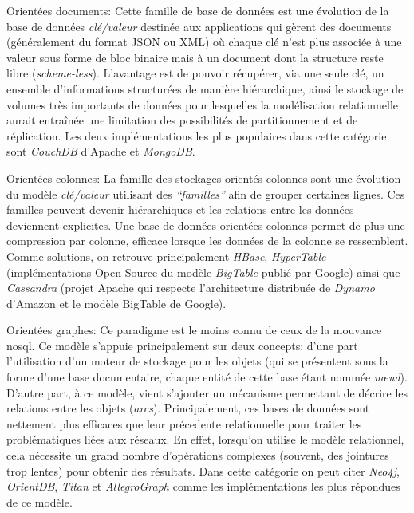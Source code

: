   \textsf{Orientées documents}: Cette famille de base de données est
  une évolution de la base de données \textit{clé/valeur} destinée aux
  applications qui gèrent des documents (généralement du format
  \textsc{JSON} ou \textsc{XML}) où chaque clé n'est plus associée à
  une valeur sous forme de bloc binaire mais à un document dont la
  structure reste libre (\textit{scheme-less}). L'avantage est de
  pouvoir récupérer, via une seule clé, un ensemble d’informations
  structurées de manière hiérarchique, ainsi le stockage de
  volumes très importants de données pour lesquelles la modélisation
  relationnelle aurait entraînée une limitation des possibilités de
  partitionnement et de réplication. Les deux implémentations les plus
  populaires dans cette catégorie sont \emph{CouchDB} d'Apache et
  \emph{MongoDB}.\bigskip

  \textsf{Orientées colonnes}: La famille des stockages orientés
  colonnes sont une évolution du modèle \textit{clé/valeur} utilisant
  des \textit{``familles''} afin de grouper certaines lignes. Ces
  familles peuvent devenir hiérarchiques et les relations entre les
  données deviennent explicites. Une base de données orientées
  colonnes permet de plus une compression par colonne, efficace
  lorsque les données de la colonne se ressemblent. Comme solutions,
  on retrouve principalement \emph{HBase}, \emph{HyperTable}
  (implémentations Open Source du modèle \emph{BigTable}
  \cite{chang2008bigtable} publié par Google) ainsi que
  \emph{Cassandra} (projet Apache qui respecte l'architecture
  distribuée de \emph{Dynamo} \cite{decandia2007dynamo} d'Amazon et le
  modèle BigTable de Google).\bigskip

  \textsf{Orientées graphes}: Ce paradigme est le moins connu de ceux
  de la mouvance \acrshort{nosql}. Ce modèle s'appuie principalement
  sur deux concepts: d'une part l'utilisation d'un moteur de stockage
  pour les objets (qui se présentent sous la forme d'une base
  documentaire, chaque entité de cette base étant nommée
  \emph{nœud}). D'autre part, à ce modèle, vient s'ajouter un
  mécanisme permettant de décrire les relations entre les objets
  (\emph{arcs}). Principalement, ces bases de données sont nettement
  plus efficaces que leur précedente relationnelle pour traiter les
  problématiques liées aux réseaux.  En effet, lorsqu'on utilise le
  modèle relationnel, cela nécessite un grand nombre d'opérations
  complexes (souvent, des jointures trop lentes) pour obtenir des
  résultats. Dans cette catégorie on peut citer \emph{Neo4j},
  \emph{OrientDB}, \emph{Titan} et \emph{AllegroGraph} comme les
  implémentations les plus répondues de ce modèle.

